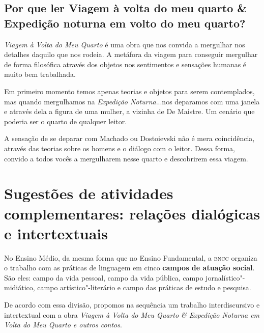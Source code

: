 \documentclass[12pt]{extarticle}
\begin{document}


\subsection{Por que ler Viagem à volta do meu quarto \& Expedição noturna em
volto do meu quarto?}

\emph{Viagem à Volta do Meu Quarto} é uma obra que nos convida a
mergulhar nos detalhes daquilo que nos rodeia. A metáfora da viagem para
conseguir mergulhar de forma filosófica através dos objetos nos
sentimentos e sensações humanas é muito bem trabalhada.

Em primeiro momento temos apenas teorias e objetos para serem
contemplados, mas quando mergulhamos na \emph{Expedição Noturna}...nos
deparamos com uma janela e através dela a figura de uma mulher, a
vizinha de De Maistre. Um cenário que poderia ser o quarto de qualquer
leitor.

A sensação de se deparar com Machado ou Dostoievski não é mera
coincidência, através das teorias sobre os homens e o diálogo com o
leitor. Dessa forma, convido a todos vocês a mergulharem nesse quarto e
descobrirem essa viagem.






\section{Sugestões de atividades complementares: relações dialógicas e
intertextuais}


No Ensino Médio, da mesma forma que no Ensino Fundamental, a \textsc{bncc}
organiza o trabalho com as práticas de linguagem em cinco \textbf{campos
de atuação social}. São eles: campo da vida pessoal, campo da vida
pública, campo jornalístico"-midiático, campo artístico"-literário e campo
das práticas de estudo e pesquisa.

De acordo com essa divisão, propomos na sequência um trabalho
interdiscursivo e intertextual com a obra \emph{Viagem à Volta do Meu
Quarto \& Expedição Noturna em Volta do Meu Quarto e outros contos}.
\end{document}
